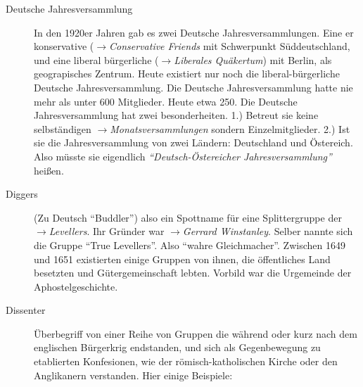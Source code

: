 \begin{description}
\item[Deutsche Jahresversammlung] In den 1920er Jahren gab es zwei Deutsche
Jahresversammlungen. Eine er konservative ($\to$\textit{Conservative Friends} mit
Schwerpunkt Süddeutschland, und eine liberal bürgerliche ($\to$\textit{Liberales
Quäkertum}) mit Berlin, als geograpisches Zentrum. Heute existiert nur noch die
liberal-bürgerliche Deutsche Jahresversammlung. Die Deutsche Jahresversammlung hatte
nie mehr als unter 600 Mitglieder. Heute etwa 250. Die Deutsche Jahresversammlung hat
zwei besonderheiten. 1.) Betreut sie keine selbständigen
$\to$\textit{Monatsversammlungen} sondern Einzelmitglieder. 2.) Ist sie die
Jahresversammlung von zwei Ländern: Deutschland und Östereich. Also müsste sie
eigendlich \textit{"`Deutsch-Östereicher Jahresversammlung"'} heißen.


\item[Diggers] (Zu Deutsch "`Buddler"') also ein Spottname für eine Splittergruppe der
$\to$\textit{Levellers}. Ihr Gründer war $\to$\textit{Gerrard Winstanley}. Selber
nannte sich die Gruppe "`True Levellers"'. Also "`wahre Gleichmacher"'. Zwischen 1649
und 1651 existierten  einige Gruppen von ihnen, die öffentliches Land besetzten und Gütergemeinschaft lebten. Vorbild war die Urgemeinde der Aphostelgeschichte.

\item[Dissenter] Überbegriff von einer Reihe von Gruppen die während oder kurz
nach dem englischen Bürgerkrig endstanden, und sich als Gegenbewegung zu
etablierten Konfesionen, wie der römisch-katholischen Kirche oder den Anglikanern
verstanden. Hier einige Beispiele:


\end{description}
